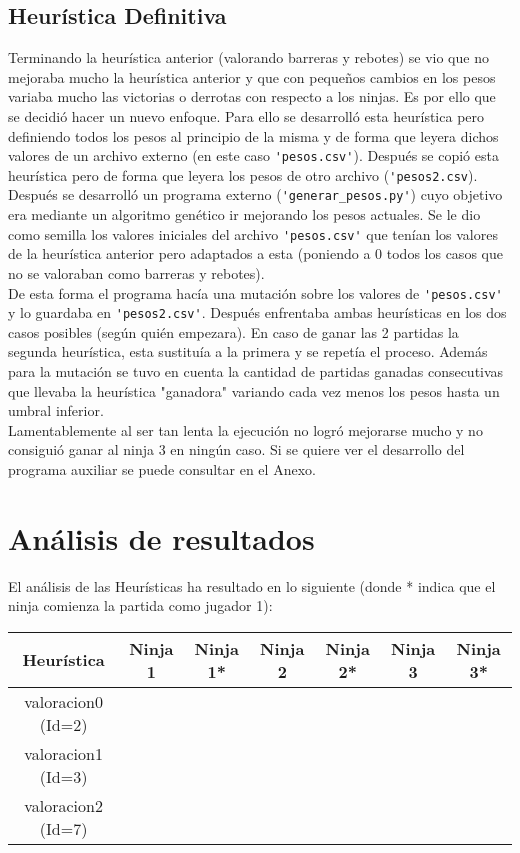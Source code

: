 \documentclass[12pt]{article}
\newcommand{\tick}{\color{green}{$\checkmark$}}
\newcommand{\cross}{\color{red}{$\times$}}
\begin{document}
    \subsection{Heurística Definitiva}
    Terminando la heurística anterior (valorando barreras y rebotes) se vio que no mejoraba mucho la heurística anterior y que con pequeños cambios en los pesos variaba mucho las victorias o derrotas con respecto a los ninjas. Es por ello que se decidió hacer un nuevo enfoque. Para ello se desarrolló esta heurística pero definiendo todos los pesos al principio de la misma y de forma que leyera dichos valores de un archivo externo (en este caso \verb|'pesos.csv'|). Después se copió esta heurística pero de forma que leyera los pesos de otro archivo (\verb|'pesos2.csv|). \\

    Después se desarrolló un programa externo (\verb|'generar_pesos.py'|) cuyo objetivo era mediante un algoritmo genético ir mejorando los pesos actuales. Se le dio como semilla los valores iniciales del archivo \verb|'pesos.csv'| que tenían los valores de la heurística anterior pero adaptados a esta (poniendo a 0 todos los casos que no se valoraban como barreras y rebotes).\\

    De esta forma el programa hacía una mutación sobre los valores de \verb|'pesos.csv'| y lo guardaba en \verb|'pesos2.csv'|. Después enfrentaba ambas heurísticas en los dos casos posibles (según quién empezara). En caso de ganar las 2 partidas la segunda heurística, esta sustituía a la primera y se repetía el proceso. Además para la mutación se tuvo en cuenta la cantidad de partidas ganadas consecutivas que llevaba la heurística "ganadora" variando cada vez menos los pesos hasta un umbral inferior.\\

    Lamentablemente al ser tan lenta la ejecución no logró mejorarse mucho y no consiguió ganar al ninja 3 en ningún caso. Si se quiere ver el desarrollo del programa auxiliar se puede consultar en el Anexo.

    \section{Análisis de resultados}

    El análisis de las Heurísticas ha resultado en lo siguiente (donde * indica que el ninja comienza la partida como jugador 1):

    \begin{center}
        \begin{tabular}{c|c|c|c|c|c|c}
            Heurística & Ninja 1 & Ninja 1* & Ninja 2 & Ninja 2* & Ninja 3 & Ninja 3*\\
            \hline
            valoracion0 (Id=2) &\tick & \tick & \cross & \cross & \cross &\cross\\
            valoracion1 (Id=3) &\cross & \cross & \tick & \tick & \cross &\cross\\
            valoracion2 (Id=7) &\cross & \cross & \cross & \cross & \cross &\cross\\
        \end{tabular}
    \end{center}
\end{document}
